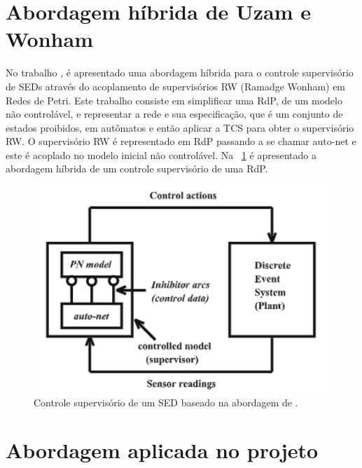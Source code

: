 \section{Abordagem h\'ibrida de Uzam e Wonham}

No trabalho \cite{UzamWonham2005}, \'e apresentado uma abordagem h\'ibrida para o controle supervis\'orio de SEDs atrav\'es do acoplamento de supervis\'orios RW (Ramadge Wonham) em Redes de Petri. Este trabalho consiste em simplificar uma RdP, de um modelo n\~ao control\'avel, e representar a rede e sua especifica\c{c}\~ao, que \'e um conjunto de estados proibidos, em aut\^omatos e ent\~ao aplicar a TCS para obter o supervis\'orio RW. O supervis\'orio RW \'e representado em RdP passando a se chamar auto-net e este \'e acoplado no modelo inicial n\~ao control\'avel. Na ~\ref{fig:uzamcontrol} \'e apresentado a abordagem h\'ibrida de um controle supervis\'orio de uma RdP.

\begin{figure}[!htb]
	\caption[Controle supervis\'orio de um SED baseado na abordagem de \cite{UzamWonham2005}.]{Controle supervis\'orio de um SED baseado na abordagem de \cite{UzamWonham2005}.}
	\label{fig:uzamcontrol}
	\includegraphics[width=16cm]{./figuras/UZAMCONTROL.png}\centering
\end{figure}



\section{Abordagem aplicada no projeto}

